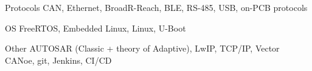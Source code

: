 


\begin{cvskills}


\cvskill
{Protocols} %
{ CAN, Ethernet, BroadR-Reach, BLE, RS-485, USB, on-PCB protocols} %


\cvskill
{OS} %
{FreeRTOS, Embedded Linux, Linux, U-Boot} %


\cvskill
{Other} %
{AUTOSAR (Classic + theory of Adaptive), LwIP, TCP/IP, Vector CANoe, git, Jenkins, CI/CD} %


\end{cvskills}